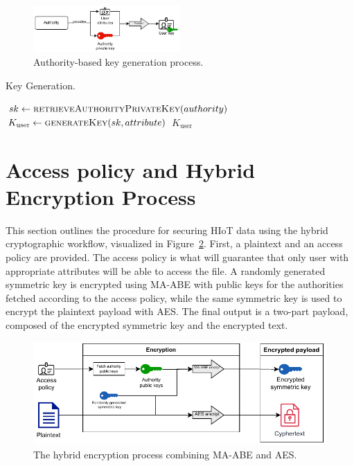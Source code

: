 \documentclass[cic,tc,english]{iiufrgs}
\numberwithin{algorithm}{chapter}
\begin{document}
        \begin{figure}[h]
            \centering
            \includegraphics[width=0.5\textwidth]{images/diagrams/keygen_diagram.pdf}
            \caption{Authority-based key generation process.}
            \label{fig:keygen_diagram}
        \end{figure}

        \begin{algorithm}[h]
            \caption{Key Generation.}
            \label{alg:keygen}
            \begin{algorithmic}[1]
                \State $sk \gets \textsc{retrieveAuthorityPrivateKey}(authority)$
                \State $K_{\text{user}} \gets \textsc{generateKey}(sk, attribute)$
                \State \Return $K_{\text{user}}$
            \EndProcedure
            \end{algorithmic}
        \end{algorithm}

    \section{Access policy and Hybrid Encryption Process}
        \label{sec:hybrid_encryption}

        This section outlines the procedure for securing HIoT data using the hybrid cryptographic workflow, visualized in Figure~\ref{fig:encryption_diagram}. First, a plaintext and an access policy are provided. The access policy is what will guarantee that only user with appropriate attributes will be able to access the file. A randomly generated symmetric key is encrypted using MA-ABE with public keys for the authorities fetched according to the access policy, while the same symmetric key is used to encrypt the plaintext payload with AES. The final output is a two-part payload, composed of the encrypted symmetric key and the encrypted text.

        \begin{figure}[h]
            \centering
            \includegraphics[width=\textwidth]{images/diagrams/encryption_diagram.pdf}
            \caption{The hybrid encryption process combining MA-ABE and AES.}
            \label{fig:encryption_diagram}
        \end{figure}
\end{document}
